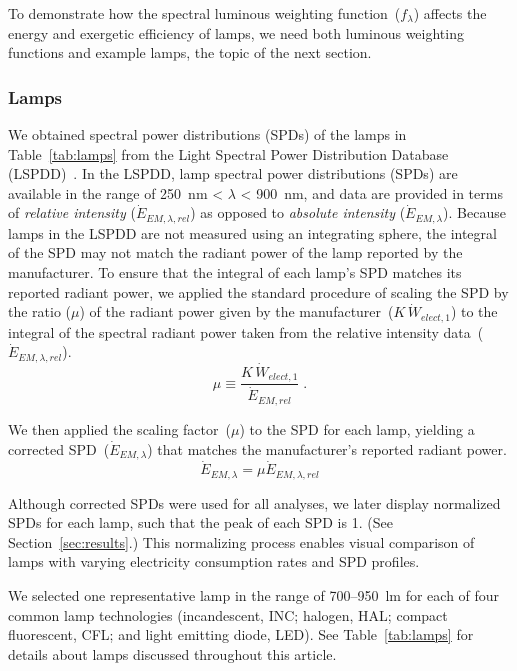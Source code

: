 \documentclass[energies,article,accept,moreauthors,pdftex]{Definitions/mdpi}\usepackage[]{graphicx}\usepackage[]{color}
\newcommand{\rev}[2]{#2}
\providecommand{\DIFdelbegin}{} %
\newcommand{\DIFscaledelfig}{0.5}
\newlength{\DIFdelgraphicswidth} %
\newlength{\DIFdelgraphicsheight} %
\newcommand{\DIFdelincludegraphics}[2][]{%
\sbox{\DIFdelgraphicsbox}{\DIFOincludegraphics[#1]{#2}}%
\settoboxwidth{\DIFdelgraphicswidth}{\DIFdelgraphicsbox} %
\settoboxtotalheight{\DIFdelgraphicsheight}{\DIFdelgraphicsbox} %
\scalebox{\DIFscaledelfig}{%
\parbox[b]{\DIFdelgraphicswidth}{\usebox{\DIFdelgraphicsbox}\\[-\baselineskip] \rule{\DIFdelgraphicswidth}{0em}}\llap{\resizebox{\DIFdelgraphicswidth}{\DIFdelgraphicsheight}{%
\setlength{\unitlength}{\DIFdelgraphicswidth}%
\begin{picture}(1,1)%
\thicklines\linethickness{2pt} %
{\color[rgb]{1,0,0}\put(0,0){\framebox(1,1){}}}%
{\color[rgb]{1,0,0}\put(0,0){\line( 1,1){1}}}%
{\color[rgb]{1,0,0}\put(0,1){\line(1,-1){1}}}%
\end{picture}%
}\hspace*{3pt}}} %
} %
\DeclareRobustCommand{\DIFdelbegin}{\DIFOdelbegin \let\includegraphics\DIFdelincludegraphics} %
\begin{document}
To demonstrate how the spectral luminous weighting function~($f_\lambda$)
affects the energy and exergetic efficiency of lamps, 
we need both luminous weighting functions and
example lamps, the topic of the next section.


\subsubsection{Lamps}
\label{sec:lamps}

We obtained spectral power distributions (SPDs) of the lamps in Table~\ref{tab:lamps} from the 
Light Spectral Power Distribution Database (LSPDD)~\cite{Roby, miguel2017, aube2013}.  {In the LSPDD, 
lamp spectral power distributions (SPDs) are available in the range of 
250~nm < $\lambda$ < 900~nm, and} data  are provided 
in terms of \emph{relative intensity} ($\dot{E}_{EM,\lambda,rel}$) 
as opposed to \emph{absolute intensity} ($\dot{E}_{EM,\lambda}$).
Because lamps in the LSPDD are not measured using an \DIFdelbegin %
integrating  sphere,
the integral of the SPD may not match the radiant power of the lamp
reported by the manufacturer.
To ensure that the integral of each lamp's SPD 
matches its reported radiant power, 
we applied the standard procedure of scaling the SPD 
by the ratio ($\mu$) of
the radiant power given by the manufacturer~($K \, \dot{W}_{elect,1}$) to  
the integral of the spectral radiant power taken from the relative intensity data~($\dot{E}_{EM,\lambda,rel}$).
\begin{equation} 
  \mu \equiv \frac{K \, \dot{W}_{elect,1}}{\dot{E}_{EM,rel}} \; .
\end{equation}

We then applied the scaling factor~($\mu$) to the SPD for each lamp, 
yielding a corrected SPD~($\dot{E}_{EM,\lambda}$)
that matches the manufacturer's reported radiant power. 
\begin{equation} 
  \dot{E}_{EM,\lambda}  = \mu \dot{E}_{EM,\lambda,rel}
\end{equation}

Although corrected SPDs were used for all analyses,
we later display normalized SPDs for each lamp,
such that the peak of each SPD is 1.
(See Section~\ref{sec:results}.)
This normalizing process enables visual comparison 
of lamps with varying electricity consumption rates
and SPD profiles.

We selected one representative lamp in the range of 700--950~lm
for each of four common lamp technologies
(incandescent, INC;
halogen, HAL;
compact fluorescent, CFL; and
light emitting diode, LED).
See Table~\ref{tab:lamps} for details about lamps discussed throughout this article.
\end{document}

